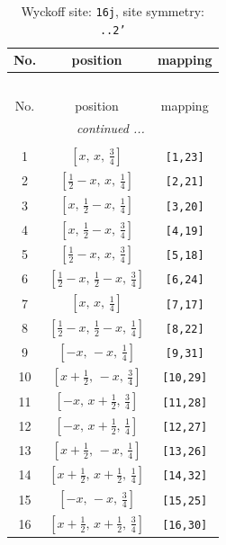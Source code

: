 \documentclass[fleqn,8pt]{jsarticle}
\begin{document}
\renewcommand{\arraystretch}{1.2}
\begin{longtable}{ccc}
\caption{Wyckoff site: {\tt 16j}, site symmetry: {\tt ..2'}}
 \\
 \hline \hline
No. & position & mapping \\ \hline \endfirsthead

\multicolumn{2}{l}{\tablename\ \thetable{}} \\
 \hline \hline
No. & position & mapping \\ \hline \endhead

 \hline \hline
\multicolumn{2}{r}{\footnotesize\it continued ...} \\ \endfoot

 \hline \hline
\multicolumn{2}{r}{} \\ \endlastfoot

1 & $\left[ x,\, x,\, \frac{3}{4} \right]$ & {\tt [1,23]} \\ \hline
2 & $\left[ \frac{1}{2} - x,\, x,\, \frac{1}{4} \right]$ & {\tt [2,21]} \\ \hline
3 & $\left[ x,\, \frac{1}{2} - x,\, \frac{1}{4} \right]$ & {\tt [3,20]} \\ \hline
4 & $\left[ x,\, \frac{1}{2} - x,\, \frac{3}{4} \right]$ & {\tt [4,19]} \\ \hline
5 & $\left[ \frac{1}{2} - x,\, x,\, \frac{3}{4} \right]$ & {\tt [5,18]} \\ \hline
6 & $\left[ \frac{1}{2} - x,\, \frac{1}{2} - x,\, \frac{3}{4} \right]$ & {\tt [6,24]} \\ \hline
7 & $\left[ x,\, x,\, \frac{1}{4} \right]$ & {\tt [7,17]} \\ \hline
8 & $\left[ \frac{1}{2} - x,\, \frac{1}{2} - x,\, \frac{1}{4} \right]$ & {\tt [8,22]} \\ \hline
9 & $\left[ - x,\, - x,\, \frac{1}{4} \right]$ & {\tt [9,31]} \\ \hline
10 & $\left[ x + \frac{1}{2},\, - x,\, \frac{3}{4} \right]$ & {\tt [10,29]} \\ \hline
11 & $\left[ - x,\, x + \frac{1}{2},\, \frac{3}{4} \right]$ & {\tt [11,28]} \\ \hline
12 & $\left[ - x,\, x + \frac{1}{2},\, \frac{1}{4} \right]$ & {\tt [12,27]} \\ \hline
13 & $\left[ x + \frac{1}{2},\, - x,\, \frac{1}{4} \right]$ & {\tt [13,26]} \\ \hline
14 & $\left[ x + \frac{1}{2},\, x + \frac{1}{2},\, \frac{1}{4} \right]$ & {\tt [14,32]} \\ \hline
15 & $\left[ - x,\, - x,\, \frac{3}{4} \right]$ & {\tt [15,25]} \\ \hline
16 & $\left[ x + \frac{1}{2},\, x + \frac{1}{2},\, \frac{3}{4} \right]$ & {\tt [16,30]} \\
\end{longtable}
\end{document}
